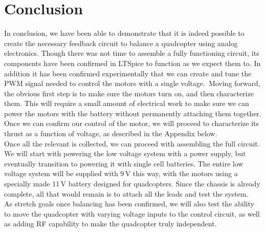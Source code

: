 \documentclass[11pt]{article} %
\begin{document}
\section{Conclusion}
In conclusion, we have been able to demonstrate that it is indeed possible to create the necessary feedback circuit to balance a quadcopter using analog electronics. Though there was not time to assemble a fully functioning circuit, its components have been confirmed in LTSpice to function as we expect them to. In addition it has been confirmed experimentally that we can create and tune the PWM signal needed to control the motors with a single voltage.\
Moving forward, the obvious first step is to make sure the motors turn on, and then characterize them. This will require a small amount of electrical work to make sure we can power the motors with the battery without permanently attaching them together. Once we can confirm our control of the motor, we will proceed to characterize its thrust as a function of voltage, as described in the Appendix below.\\
Once all the relevant is collected, we can proceed with assembling the full circuit. We will start with powering the low voltage system with a power supply, but eventually transition to powering it with single cell batteries. The entire low voltage system will be supplied with 9\,V this way, with the motors using a specially made 11\,V battery designed for quadcopters. Since the chassis is already complete, all that would remain is to attach all the leads and test the system.\\
As stretch goals once balancing has been confirmed, we will also test the ability to move the quadcopter with varying voltage inputs to the control circuit, as well as adding RF capability to make the quadcopter truly independent.
\newpage
\appendix
\end{document}
